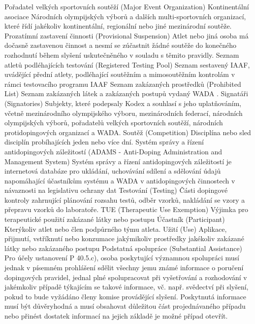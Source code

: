 \dend
\dt Pořadatel velkých sportovních soutěží (Major Event Organization)
\dd Kontinentální asociace Národních olympijských výborů a dalších multi-sportovních organizací, které řídí jakékoliv kontinentální, regionální nebo jiné mezinárodní soutěže.
\dend
\dt Prozatímní zastavení činnosti (Provisional Suspension)
\dd Atlet nebo jiná osoba má dočasně zastavenou činnost a nesmí se zúčastnit žádné soutěže do konečného rozhodnutí během slyšení uskutečněného v souladu s těmito pravidly.
\dend
\dt Seznam atletů podléhajících testování (Registered Testing Pool)
\dd Seznam sestavený IAAF, uvádějící přední atlety, podléhající soutěžním a mimosoutěžním kontrolám v rámci testovacího programu IAAF
\dend
\dt Seznam zakázaných prostředků (Prohibited List)
\dd Seznam zakázaných látek a zakázaných postupů vydaný WADA .
\dend
\dt Signatáři (Signatories)
\dd Subjekty, které podepsaly Kodex a souhlasí s jeho uplatňováním, včetně mezinárodního olympijského výboru, mezinárodních federací, národních olympijských výborů, pořadatelů velkých sportovních soutěží, národních protidopingových organizací a WADA.
\dend
\dt Soutěž (Competition)
\dd Disciplína nebo sled disciplín probíhajících jeden nebo více dní.
\dend
\dt Systém správy a řízení antidopingových záležitostí (ADAMS - Anti-Doping Administration and Management System)
\dd Systém správy a řízení antidopingových záležitostí je internetová databáze pro ukládání, uchovávání sdílení a sdělování údajů napomáhající účastníkům systému a WADA v antidopingových činnostech v návaznosti na legislativu ochrany dat
\dend
\dt Testování (Testing)
\dd Části dopingové kontroly zahrnující plánování rozsahu testů, odběr vzorků, nakládání se vzory a přepravu vzorků do laboratoře.
\dend
\dt TUE (Therapeutic Use Exemption)
\dd Výjimka pro terapeutické použití zakázané látky nebo postupu
\dend
\dt Účastník (Participant)
\dd Kterýkoliv atlet nebo člen podpůrného týmu atleta.
\dend
\dt Užití (Use)
\dd Aplikace, přijmutí, vstříknutí nebo konzumace jakýmikoliv prostředky jakékoliv zakázané látky nebo zakázaného postupu
\dend
\dt Podstatná spolupráce (Substantial Assistance)
\dd Pro účely ustanovení P 40.5.c), osoba poskytující významnou spolupráci musí jednak v písemném prohlášení sdělit všechny jemu známé informace o poručení dopingových pravidel, jednal plné spolupracovat při vyšetřování a rozhodování v jakémkoliv případě týkajícím se takové informace, vč. např. svědectví při slyšení, pokud to bude vyžádáno členy komise provádějící slyšení. Poskytnutá informace musí být důvěryhodná a musí obsahovat důležitou část projednávaného případu nebo přinést dostatek informací na jejich základě je možné případ otevřít.
